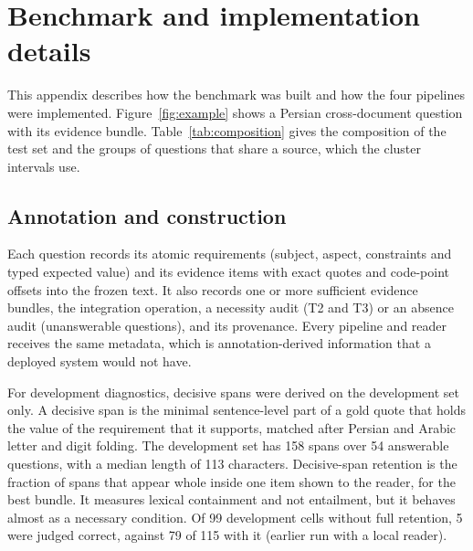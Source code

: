 \section{Benchmark and implementation details}
\label{app:benchmark}

This appendix describes how the benchmark was built and how the four pipelines were implemented.
Figure~\ref{fig:example} shows a Persian cross-document question with its evidence bundle.
Table~\ref{tab:composition} gives the composition of the test set and the groups of questions that share a source, which the cluster intervals use.



\subsection{Annotation and construction}
Each question records its atomic requirements (subject, aspect, constraints and typed expected value) and its evidence items with exact quotes and code-point offsets into the frozen text.
It also records one or more sufficient evidence bundles, the integration operation, a necessity audit (T2 and T3) or an absence audit (unanswerable questions), and its provenance.
Every pipeline and reader receives the same metadata, which is annotation-derived information that a deployed system would not have.

For development diagnostics, decisive spans were derived on the development set only.
A decisive span is the minimal sentence-level part of a gold quote that holds the value of the requirement that it supports, matched after Persian and Arabic letter and digit folding.
The development set has 158 spans over 54 answerable questions, with a median length of 113 characters.
Decisive-span retention is the fraction of spans that appear whole inside one item shown to the reader, for the best bundle.
It measures lexical containment and not entailment, but it behaves almost as a necessary condition.
Of 99 development cells without full retention, 5 were judged correct, against 79 of 115 with it (earlier run with a local reader).

